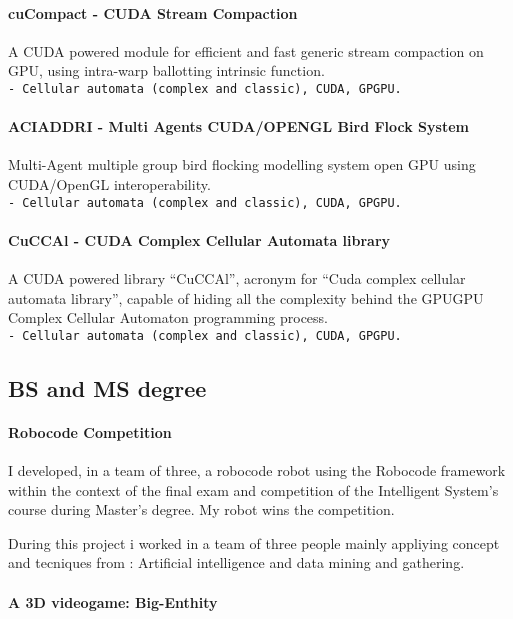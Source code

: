\documentclass[a4paper,10pt]{article}
\begin{document}
 \paragraph{cuCompact - CUDA Stream Compaction} 
A CUDA powered module for efficient and fast generic stream compaction on GPU,
using intra-warp ballotting intrinsic function. 
\hfill \\
\texttt{- 
\noindent Cellular automata (complex and classic), CUDA, GPGPU.}

 \paragraph{ACIADDRI - Multi Agents CUDA/OPENGL Bird Flock System} 
Multi-Agent multiple group bird flocking modelling system open GPU using
CUDA/OpenGL interoperability.
\hfill \\
\texttt{- 
\noindent Cellular automata (complex and classic), CUDA, GPGPU.}


\paragraph{CuCCAl - CUDA Complex Cellular Automata library} 
A CUDA powered library “CuCCAl”, acronym for “Cuda complex cellular
automata library”, capable of hiding all the complexity behind the GPUGPU
Complex Cellular Automaton programming process.
\hfill \\
\texttt{- 
\noindent Cellular automata (complex and classic), CUDA, GPGPU.}

 \subsection{BS and MS degree}

\paragraph{Robocode Competition} 
I developed, in a team of three, a robocode robot using the Robocode framework
within the context of the final exam and competition of the Intelligent System's
course during Master's degree. My robot wins the competition.

\noindent During this project i worked in a team of three people mainly
appliying concept and tecniques from :
\noindent Artificial intelligence and data mining and gathering.
 

 \paragraph{A 3D videogame: Big-Enthity } 
\end{document}

